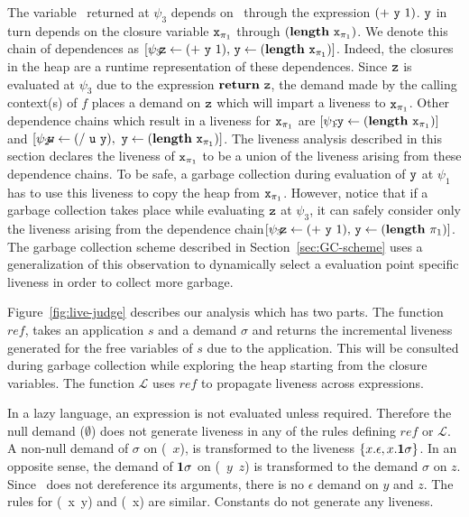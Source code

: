 \documentclass[preprint, 9pt]{sigplanconf}
\begin{document}
The  variable \pz\   returned  at  $\psi_3$ depends  on  \py\ 
  through  the  expression $(+~\mbox{\tt y}~1)$.   $\mbox{\tt y}$  in  turn depends  on  the
  closure  variable  $\mbox{\tt x}_{\mathit{\pi}_1}$   through  $(\mathbf{length}~\mbox{\tt x}_{\mathit{\pi}_1})$.   We
  denote  this chain  of dependences  as $\lbrack  \psi_3\!\!\!:\!\!\!\mbox{\tt z} \leftarrow
  (+~\mbox{\tt y}~1),\,  \mbox{\tt y}  \leftarrow   (\mathbf{length}~\mbox{\tt x}_{\mathit{\pi}_1})\rbrack$.   Indeed,  the
  closures  in  the  heap  are   a  runtime  representation  of  these
  dependences.  Since  $\mbox{\tt z}$  is  evaluated   at  $\psi_3$  due  to  the
  expression $\mbox{$\mathbf{ return}$}~\mbox{\tt z}$,  the demand made by  the calling context(s)
  of  $f$ places  a demand  on  $\mbox{\tt z}$ which  will impart  a liveness  to
  $\mbox{\tt x}_{\pi_1}$.  Other dependence chains which result in a liveness for
  $\mbox{\tt x}_{\pi_1}$       are       $\lbrack       \psi_1\!\!\!:\!\!\mbox{\tt y}       \leftarrow
  (\mathbf{length}~\mbox{\tt x}_{\pi_1})\rbrack$ and $\lbrack \psi_2\!\!\!:\!\!\!\mbox{\tt w} \leftarrow (/~\mbox{\tt u}~\mbox{\tt y}),\,\,
  \mbox{\tt y}  \leftarrow  (\mathbf{length}~\mbox{\tt x}_{\pi_1})\rbrack$.   The  liveness  analysis
  described in this section declares the liveness of $\mbox{\tt x}_{\pi_1}$ to be
  a union of the liveness arising from these dependence chains.  To
  be safe, a  garbage collection during evaluation of  $\mbox{\tt y}$ at $\psi_1$
  has  to  use  this  liveness  to copy  the  heap  from  $\mbox{\tt x}_{\pi_1}$.
  However,  notice that  if  a garbage  collection  takes place  while
  evaluating $\mbox{\tt z}$ at $\psi_3$, it can safely consider only the liveness
  arising from the dependence  chain\linebreak $\lbrack  \psi_3\!\!\!:\!\!\!\pz \leftarrow
  (+~\py~1),\,   \py  \leftarrow   (\length~\x_{\pi_1})\rbrack$.   The   garbage
  collection  scheme described  in Section~\ref{sec:GC-scheme}  uses a
  generalization  of   this  observation   to  dynamically   select  a
  evaluation point specific liveness in order to collect more garbage.



Figure~\ref{fig:live-judge}  describes  our  analysis  which  has  two
parts. The  function $\mathit{ref}$,  takes an  application $s$  and a
demand $\sigma$ and returns the incremental liveness generated for the
free variables of $s$ due to  the application.  This will be consulted
during garbage collection  while exploring the heap  starting from the
closure  variables.  The function $\mathcal{L}$  uses  $\mathit{ref}$ to  propagate
liveness across expressions.

In  a   lazy  language,   an  expression   is  not   evaluated  unless
required. Therefore  the null  demand ($\emptyset$) does  not generate
liveness in any of the rules defining $\mathit{ref}$ or $\mathcal{L}$.
A non-null  demand of  $\sigma$ on (\CDR~$x$),  is transformed  to the
liveness $\{x.\epsilon,  x.\mathbf{1}\sigma\}$.  In an opposite  sense, the
demand  of  $\mathbf{1}\sigma$ on  (\CONS~$y$~$z$)  is  transformed to  the
demand  $\sigma$  on  $z$.   Since \CONS\  does  not  dereference  its
arguments, there  is no $\epsilon$ demand  on $y$ and $z$.   The rules
for (\PRIM~x~y) and (\NULLQ~x) are  similar. Constants do not generate
any liveness.
\end{document}

